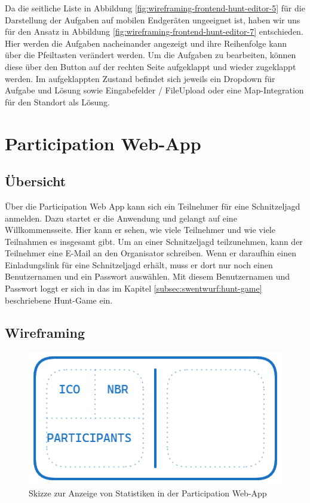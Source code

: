 Da die seitliche Liste in Abbildung \ref{fig:wireframing-frontend-hunt-editor-5} für die Darstellung der Aufgaben auf mobilen Endgeräten ungeeignet ist, haben wir uns für den Ansatz in Abbildung \ref{fig:wireframing-frontend-hunt-editor-7} entschieden. Hier werden die Aufgaben nacheinander angezeigt und ihre Reihenfolge kann über die Pfeiltasten verändert werden. Um die Aufgaben zu bearbeiten, können diese über den Button auf der rechten Seite aufgeklappt und wieder zugeklappt werden. Im aufgeklappten Zustand befindet sich jeweils ein Dropdown für Aufgabe und Lösung sowie Eingabefelder / FileUpload oder eine Map-Integration für den Standort als Lösung. 

\section{Participation Web-App}

\subsection{Übersicht}

Über die Participation Web App kann sich ein Teilnehmer für eine Schnitzeljagd anmelden. Dazu startet er die Anwendung und gelangt auf eine Willkommensseite. Hier kann er sehen, wie viele Teilnehmer und wie viele Teilnahmen es insgesamt gibt. Um an einer Schnitzeljagd teilzunehmen, kann der Teilnehmer eine E-Mail an den Organisator schreiben. Wenn er daraufhin einen Einladungslink für eine Schnitzeljagd erhält, muss er dort nur noch einen Benutzernamen und ein Passwort auswählen. Mit diesem Benutzernamen und Passwort loggt er sich in das im Kapitel \ref{subsec:swentwurf:hunt-game} beschriebene Hunt-Game ein.

\subsection{Wireframing}

\begin{figure}[H]
  \centering
  \includegraphics[width=1\textwidth]{images/PrAr_Scavhunt_Wireframing_Participant_1.png}
  \caption{Skizze zur Anzeige von Statistiken in der Participation Web-App}
  \label{fig:wireframing-frontend-participant-1}
\end{figure}

